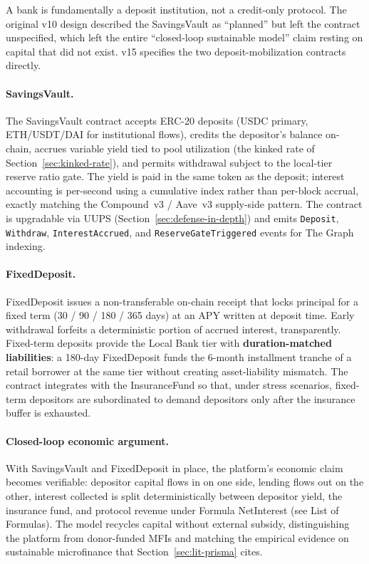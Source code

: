 \documentclass[12pt,a4paper]{report}
\begin{document}
A bank is fundamentally a deposit institution, not a credit-only protocol. The original v10 design described the SavingsVault as ``planned'' but left the contract unspecified, which left the entire ``closed-loop sustainable model'' claim resting on capital that did not exist. v15 specifies the two deposit-mobilization contracts directly.

\paragraph{SavingsVault.}
The SavingsVault contract accepts ERC-20 deposits (USDC primary, ETH/USDT/DAI for institutional flows), credits the depositor's balance on-chain, accrues variable yield tied to pool utilization (the kinked rate of Section~\ref{sec:kinked-rate}), and permits withdrawal subject to the local-tier reserve ratio gate. The yield is paid in the same token as the deposit; interest accounting is per-second using a cumulative index rather than per-block accrual, exactly matching the Compound~v3 / Aave~v3 supply-side pattern. The contract is upgradable via UUPS (Section~\ref{sec:defense-in-depth}) and emits \texttt{Deposit}, \texttt{Withdraw}, \texttt{InterestAccrued}, and \texttt{ReserveGateTriggered} events for The Graph indexing.

\paragraph{FixedDeposit.}
FixedDeposit issues a non-transferable on-chain receipt that locks principal for a fixed term (30 / 90 / 180 / 365 days) at an APY written at deposit time. Early withdrawal forfeits a deterministic portion of accrued interest, transparently. Fixed-term deposits provide the Local Bank tier with \textbf{duration-matched liabilities}: a 180-day FixedDeposit funds the 6-month installment tranche of a retail borrower at the same tier without creating asset-liability mismatch. The contract integrates with the InsuranceFund so that, under stress scenarios, fixed-term depositors are subordinated to demand depositors only after the insurance buffer is exhausted.

\paragraph{Closed-loop economic argument.}
With SavingsVault and FixedDeposit in place, the platform's economic claim becomes verifiable: depositor capital flows in on one side, lending flows out on the other, interest collected is split deterministically between depositor yield, the insurance fund, and protocol revenue under Formula NetInterest (see List of Formulas). The model recycles capital without external subsidy, distinguishing the platform from donor-funded MFIs and matching the empirical evidence on sustainable microfinance that Section~\ref{sec:lit-prisma} cites.
\end{document}
